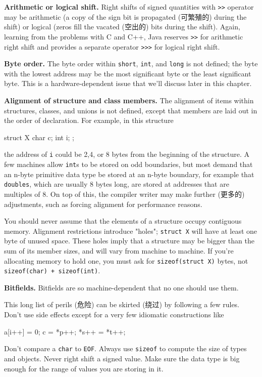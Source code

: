 \textbf{Arithmetic or logical shift.} Right shifts of signed quantities
with \verb'>>' operator may be arithmetic (a copy of the sign bit is
propagated (可繁殖的) during the shift) or logical (zeros fill the vacated
(空出的) bits during the shift). Again, learning from the problems with C
and C++, Java reserves \verb'>>' for arithmetic right shift and provides a
separate operator \verb'>>>' for logical right shift.

\textbf{Byte order.} The byte order within \verb'short', \verb'int', and
\verb'long' is not defined; the byte with the lowest address may be the
most significant byte or the least significant byte. This is a
hardware-dependent issue that we'll discuss later in this chapter.

\textbf{Alignment of structure and class members.} The alignment of items
within structures, classes, and unions is not defined, except that members
are laid out in the order of declaration. For example, in this structure
\begin{wellcode}
    struct X {
        char    c;
        int     i;
    };
\end{wellcode}
the address of \verb'i' could be 2,4, or 8 bytes from the beginning of the
structure. A few machines allow \verb'int's to be stored on odd boundaries,
but most demand that an n-byte primitive data type be stored at an n-byte
boundary, for example that \verb'doubles', which are usually 8 bytes long,
are stored at addresses that are multiples of 8.  On top of this, the
compiler writer may make further (更多的) adjustments, such as forcing
alignment for performance reasons.

You should never assume that the elements of a structure occupy contiguous
memory. Alignment restrictions introduce "holes"; \verb'struct X' will have
at least one byte of unused space. These holes imply that a structure may
be bigger than the sum of its member sizes, and will vary from machine to
machine. If you're allocating memory to hold one, you must ask for
\texttt{sizeof(struct X)} bytes, not \verb'sizeof(char) + sizeof(int)'.

\textbf{Bitfields.} Bitfields are so machine-dependent that no one should
use them.

This long list of perils (危险) can be skirted (绕过) by following a few
rules. Don't use side effects except for a very few idiomatic constructions
like
\begin{wellcode}
    a[i++] = 0;
    c = *p++;
    *s++ = *t++;
\end{wellcode}
Don't compare a \verb'char' to \verb'EOF'. Always use \verb'sizeof' to
compute the size of types and objects. Never right shift a signed value.
Make sure the data type is big enough for the range of values you are
storing in it.

